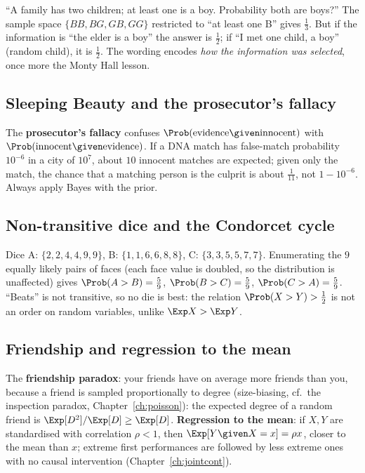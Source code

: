 ``A family has two children; at least one is a boy. Probability both are boys?'' The sample space
$\{BB,BG,GB,GG\}$ restricted to ``at least one B'' gives $\tfrac13$. But if the information is ``the elder is a boy''
the answer is $\tfrac12$; if ``I met one child, a boy'' (random child), it is $\tfrac12$. The wording encodes
\emph{how the information was selected}, once more the Monty Hall lesson.

\subsection{Sleeping Beauty and the prosecutor's fallacy}

The \textbf{prosecutor's fallacy} confuses $\Prob(\text{evidence}\given\text{innocent})$ with
$\Prob(\text{innocent}\given\text{evidence})$. If a DNA match has false-match probability $10^{-6}$ in a
city of $10^7$, about $10$ innocent matches are expected; given only the match, the chance that a matching person
is the culprit is about $\tfrac1{11}$, not $1-10^{-6}$. Always apply Bayes with the prior.

\subsection{Non-transitive dice and the Condorcet cycle}

Dice A: $\{2,2,4,4,9,9\}$, B: $\{1,1,6,6,8,8\}$, C: $\{3,3,5,5,7,7\}$. Enumerating the $9$ equally likely pairs
of faces (each face value is doubled, so the distribution is unaffected) gives $\Prob(A>B)=\tfrac59$,
$\Prob(B>C)=\tfrac59$, $\Prob(C>A)=\tfrac59$. ``Beats'' is not transitive, so no die is best: the relation
$\Prob(X>Y)>\tfrac12$ is not an order on random variables, unlike $\Exp X>\Exp Y$.

\subsection{Friendship and regression to the mean}

The \textbf{friendship paradox}: your friends have on average more friends than you, because a friend is sampled
proportionally to degree (size-biasing, cf.\ the inspection paradox, Chapter~\ref{ch:poisson}): the expected degree of a
random friend is $\Exp[D^2]/\Exp[D]\ge\Exp[D]$. \textbf{Regression to the mean}: if $X,Y$ are standardised with
correlation $\rho<1$, then $\Exp[Y\given X=x]=\rho x$, closer to the mean than $x$; extreme first performances are
followed by less extreme ones with no causal intervention (Chapter~\ref{ch:jointcont}).

